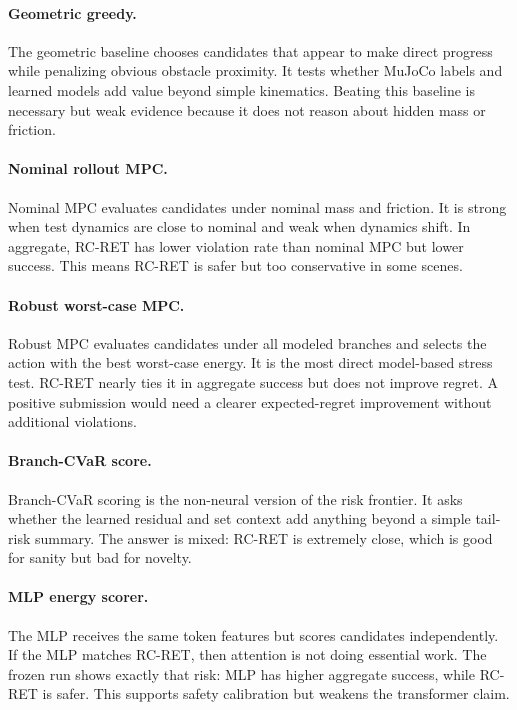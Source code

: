 \documentclass{article}
\newcommand{\method}{RC-RET}
\begin{document}
\paragraph{Geometric greedy.}
The geometric baseline chooses candidates that appear to make direct progress while penalizing obvious obstacle proximity.  It tests whether MuJoCo labels and learned models add value beyond simple kinematics.  Beating this baseline is necessary but weak evidence because it does not reason about hidden mass or friction.

\paragraph{Nominal rollout MPC.}
Nominal MPC evaluates candidates under nominal mass and friction.  It is strong when test dynamics are close to nominal and weak when dynamics shift.  In aggregate, \method{} has lower violation rate than nominal MPC but lower success.  This means \method{} is safer but too conservative in some scenes.

\paragraph{Robust worst-case MPC.}
Robust MPC evaluates candidates under all modeled branches and selects the action with the best worst-case energy.  It is the most direct model-based stress test.  \method{} nearly ties it in aggregate success but does not improve regret.  A positive submission would need a clearer expected-regret improvement without additional violations.

\paragraph{Branch-CVaR score.}
Branch-CVaR scoring is the non-neural version of the risk frontier.  It asks whether the learned residual and set context add anything beyond a simple tail-risk summary.  The answer is mixed: \method{} is extremely close, which is good for sanity but bad for novelty.

\paragraph{MLP energy scorer.}
The MLP receives the same token features but scores candidates independently.  If the MLP matches \method{}, then attention is not doing essential work.  The frozen run shows exactly that risk: MLP has higher aggregate success, while \method{} is safer.  This supports safety calibration but weakens the transformer claim.
\end{document}
